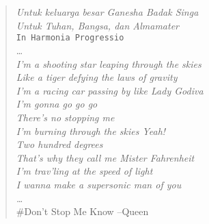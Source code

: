\chapter*{}
\label{chp:dedikasi}
\begin{center}

  \vspace{3cm} %

  \begin{quote} %
    \textit{\large{Untuk keluarga besar Ganesha Badak Singa}}\\
    \vspace{0.2cm} %
    \textit{Untuk Tuhan, Bangsa, dan Almamater}\\
    \texttt{In Harmonia Progressio}\\
    \vspace{0.5cm} %
    \dots\\
    \textit{I'm a shooting star leaping through the skies\\
      Like a tiger defying the laws of gravity\\
      I'm a racing car passing by like Lady Godiva\\
      I'm gonna go go go\\
      There's no stopping me}\\
    \vspace{0.5cm}
    \textit{I'm burning through the skies Yeah!\\
      Two hundred degrees\\
      That's why they call me Mister Fahrenheit\\
      I'm trav'ling at the speed of light\\
      I wanna make a supersonic man of you\\
      \dots}\\
    \vspace{0.5cm}
    \footnotesize{\#Don't Stop Me Know --Queen}
  \end{quote}

\end{center}

